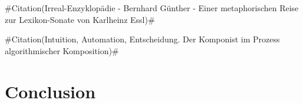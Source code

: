 \documentclass[a4paper,12pt]{article}
\newcommand{\zitat}[2]{\#Citation(#2)\#}
\begin{document}
\zitat{Essl nutzt die heutigen Möglichkeiten der TECHNIK als Mittel, musikalische Möglichkeitsstrukturen zu schaffen, die in der Lage sind, unbeliebig Anderes zu realisieren als die Vorstellung des Komponisten.}
{Irreal-Enzyklopädie - Bernhard Günther - Einer metaphorischen Reise zur Lexikon-Sonate von Karlheinz Essl}

\zitat{In meinem Aufsatz Computer Aided Composition, den ich 1991 veröffentlicht habe, geht es genau um die Frage, was der Computer dem Komponisten zurückgibt. Darin habe ich zwei Sachen postuliert. Erstens: Wir müssen den Computer selber programmieren, d. h. wir müssen unsere eigenen persönlichen individuellen kompositorischen Ideen und Fragestellungen in Form von Computerprogrammen formulieren. Zweitens: Der Computer wird dadurch zum Werkzeug, das diese Regelsysteme (die ja nicht bloß abstrakt sind, sondern von kompositorischen Ideen ausgehen) anwendet, dabei Ergebnisse erzeugt und uns diese dann widerspiegelt. In den vom Computer errechneten Resultaten erkennen wir die Tragweite unserer kompositorischen Ideen. Ich vergleiche den Computer (bzw. die Software, die auf ihm läuft) gerne mit einem Spiegel, der das, was wir uns vorstellen, sehr rasch realisieren kann.}
{Intuition, Automation, Entscheidung. Der Komponist im Prozess algorithmischer Komposition}



\section{Conclusion}
\end{document}
